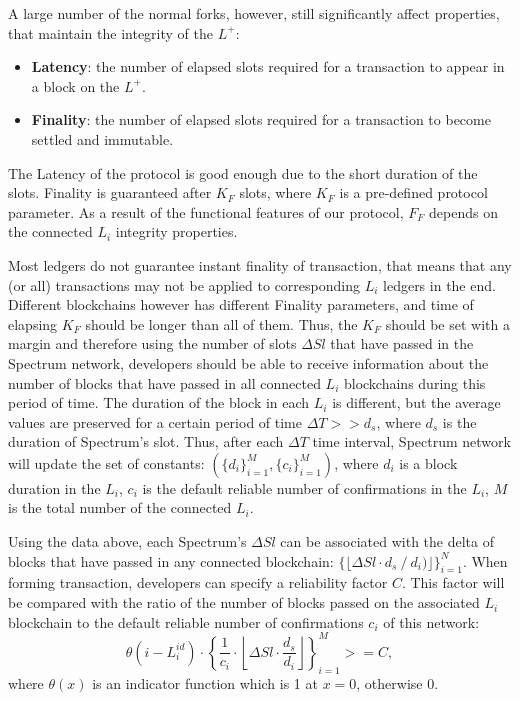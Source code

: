 A large number of the normal forks, however, still significantly affect properties, that maintain the integrity of the $L^+$:
\begin{itemize}
    \item \textbf{Latency}: the number of elapsed slots required for a transaction to appear in a block on the $L^+$.
    \item \textbf{Finality}: the number of elapsed slots required for a transaction to become settled and immutable.
\end{itemize}
The Latency of the protocol is good enough due to the short duration of the slots.
Finality is guaranteed after $K_F$ slots, where $K_F$ is a pre-defined protocol parameter.
As a result of the functional features of our protocol, $F_F$ depends on the connected $L_i$ integrity properties.

Most ledgers do not guarantee instant finality of transaction, that means that any (or all) transactions may not be applied to corresponding $L_i$ ledgers in the end.
Different blockchains however has different Finality parameters, and time of elapsing $K_F$ should be longer than all of them.
Thus, the $K_F$ should be set with a margin and therefore using the number of slots $\Delta Sl$ that have passed in the Spectrum network, developers should be able to receive information about the number of blocks that have passed in all connected $L_i$ blockchains during this period of time.
The duration of the block in each $L_i$ is different, but the average values are preserved for a certain period of time ${\Delta T >> d_s}$, where $d_s$ is the duration of Spectrum's slot.
Thus, after each $\Delta T$ time interval, Spectrum network will update the set of constants: ${(\{d_{i}\}_{i=1}^{M},\{c_{i}\}_{i=1}^{M})}$, where $d_i$ is a block duration in the $L_i$, $c_i$ is the default reliable number of confirmations in the $L_i$, $M$ is the total number of the connected $L_i$.

Using the data above, each Spectrum's $\Delta Sl$ can be associated with the delta of blocks that have passed in any connected blockchain: ${\{\lfloor \Delta Sl \cdot d_s \mathbin{/} d_i)\rfloor\}_{i=1}^{N}}$.
When forming transaction, developers can specify a reliability factor $C$.
This factor will be compared with the ratio of the number of blocks passed on the associated $L_i$ blockchain to the default reliable number of confirmations $c_i$ of this network:
\begin{equation}
    \theta(i-L_i^{id})\cdot \left\{\frac{1}{c_i} \cdot \left\lfloor \Delta Sl \cdot \frac{d_s}{d_i}\right\rfloor\right\}_{i=1}^{M} >= C,\label{eq:equation2}
\end{equation}
where $\theta(x)$ is an indicator function which is 1 at $x = 0$, otherwise 0.

